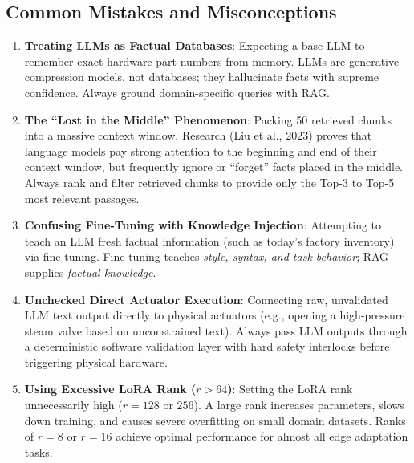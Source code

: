 \subsection{Common Mistakes and Misconceptions}\label{subsec:mistakes}

\begin{warning}
\begin{enumerate}
    \item \textbf{Treating LLMs as Factual Databases}: Expecting a base LLM to remember exact hardware part numbers from memory. LLMs are generative compression models, not databases; they hallucinate facts with supreme confidence. Always ground domain-specific queries with RAG.
    \item \textbf{The ``Lost in the Middle'' Phenomenon}: Packing 50 retrieved chunks into a massive context window. Research (Liu et al., 2023) proves that language models pay strong attention to the beginning and end of their context window, but frequently ignore or ``forget'' facts placed in the middle. Always rank and filter retrieved chunks to provide only the Top-3 to Top-5 most relevant passages.
    \item \textbf{Confusing Fine-Tuning with Knowledge Injection}: Attempting to teach an LLM fresh factual information (such as today's factory inventory) via fine-tuning. Fine-tuning teaches \emph{style, syntax, and task behavior}; RAG supplies \emph{factual knowledge}.
    \item \textbf{Unchecked Direct Actuator Execution}: Connecting raw, unvalidated LLM text output directly to physical actuators (e.g., opening a high-pressure steam valve based on unconstrained text). Always pass LLM outputs through a deterministic software validation layer with hard safety interlocks before triggering physical hardware.
    \item \textbf{Using Excessive LoRA Rank ($r > 64$)}: Setting the LoRA rank unnecessarily high ($r = 128$ or $256$). A large rank increases parameters, slows down training, and causes severe overfitting on small domain datasets. Ranks of $r = 8$ or $r = 16$ achieve optimal performance for almost all edge adaptation tasks.
\end{enumerate}
\end{warning}

